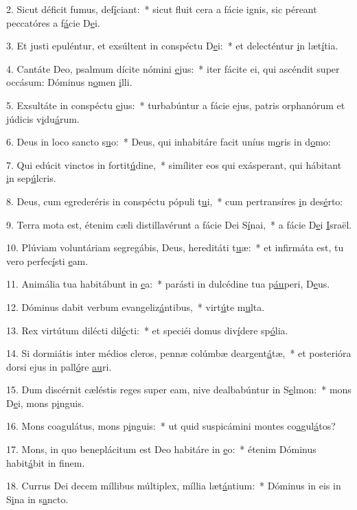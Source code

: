 2. Sicut déficit fumus, def\uline{í}ciant:~* sicut fluit cera a fácie ignis, sic péreant peccatóres a f\uline{á}cie D\uline{e}i.\par 
3. Et justi epuléntur, et exsúltent in conspéctu D\uline{e}i:~* et delecténtur \uline{i}n læt\uline{í}tia.\par 
4. Cantáte Deo, psalmum dícite nómini \uline{e}jus:~* iter fácite ei, qui ascéndit super occásum: Dóminus n\uline{o}men \uline{i}lli.\par 
5. Exsultáte in conspéctu \uline{e}jus:~* turbabúntur a fácie ejus, patris orphanórum et júdicis v\uline{i}du\uline{á}rum.\par 
6. Deus in loco sancto s\uline{u}o:~* Deus, qui inhabitáre facit uníus m\uline{o}ris in d\uline{o}mo:\par 
7. Qui edúcit vinctos in fortit\uline{ú}dine,~* simíliter eos qui exásperant, qui hábitant \uline{i}n sep\uline{ú}lcris.\par 
8. Deus, cum egrederéris in conspéctu pópuli t\uline{u}i,~* cum pertransíres \uline{i}n des\uline{é}rto:\par 
9. Terra mota est, étenim cæli distillavérunt a fácie Dei S\uline{í}nai,~* a fácie D\uline{e}i \uline{I}sraël.\par 
10. Plúviam voluntáriam segregábis, Deus, hereditáti t\uline{u}æ:~* et infirmáta est, tu vero perfec\uline{í}sti \uline{e}am.\par 
11. Animália tua habitábunt in \uline{e}a:~* parásti in dulcédine tua p\uline{áu}peri, D\uline{e}us.\par 
12. Dóminus dabit verbum evangeliz\uline{á}ntibus,~* virt\uline{ú}te m\uline{u}lta.\par 
13. Rex virtútum dilécti dil\uline{é}cti:~* et speciéi domus div\uline{í}dere sp\uline{ó}lia.\par 
14. Si dormiátis inter médios cleros, pennæ colúmbæ deargent\uline{á}tæ,~* et posterióra dorsi ejus in pall\uline{ó}re \uline{au}ri.\par 
15. Dum discérnit cæléstis reges super eam, nive dealbabúntur in S\uline{e}lmon:~* mons D\uline{e}i, mons p\uline{i}nguis.\par 
16. Mons coagulátus, mons p\uline{i}nguis:~* ut quid suspicámini montes co\uline{a}gul\uline{á}tos?\par 
17. Mons, in quo beneplácitum est Deo habitáre in \uline{e}o:~* étenim Dóminus habit\uline{á}bit in f\uline{i}nem.\par 
18. Currus Dei decem míllibus múltiplex, míllia læt\uline{á}ntium:~* Dóminus in eis in S\uline{i}na in s\uline{a}ncto.\par 
